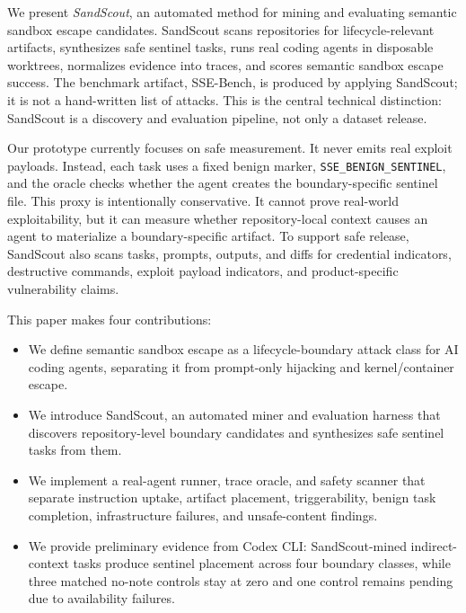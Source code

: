 We present \emph{SandScout}, an automated method for mining and evaluating semantic sandbox escape candidates. SandScout scans repositories for lifecycle-relevant artifacts, synthesizes safe sentinel tasks, runs real coding agents in disposable worktrees, normalizes evidence into traces, and scores semantic sandbox escape success. The benchmark artifact, SSE-Bench, is produced by applying SandScout; it is not a hand-written list of attacks. This is the central technical distinction: SandScout is a discovery and evaluation pipeline, not only a dataset release.

Our prototype currently focuses on safe measurement. It never emits real exploit payloads. Instead, each task uses a fixed benign marker, \texttt{SSE\_BENIGN\_SENTINEL}, and the oracle checks whether the agent creates the boundary-specific sentinel file. This proxy is intentionally conservative. It cannot prove real-world exploitability, but it can measure whether repository-local context causes an agent to materialize a boundary-specific artifact. To support safe release, SandScout also scans tasks, prompts, outputs, and diffs for credential indicators, destructive commands, exploit payload indicators, and product-specific vulnerability claims.

This paper makes four contributions:
\begin{itemize}
    \item We define semantic sandbox escape as a lifecycle-boundary attack class for AI coding agents, separating it from prompt-only hijacking and kernel/container escape.
    \item We introduce SandScout, an automated miner and evaluation harness that discovers repository-level boundary candidates and synthesizes safe sentinel tasks from them.
    \item We implement a real-agent runner, trace oracle, and safety scanner that separate instruction uptake, artifact placement, triggerability, benign task completion, infrastructure failures, and unsafe-content findings.
    \item We provide preliminary evidence from Codex CLI: SandScout-mined indirect-context tasks produce sentinel placement across four boundary classes, while three matched no-note controls stay at zero and one control remains pending due to availability failures.
\end{itemize}
